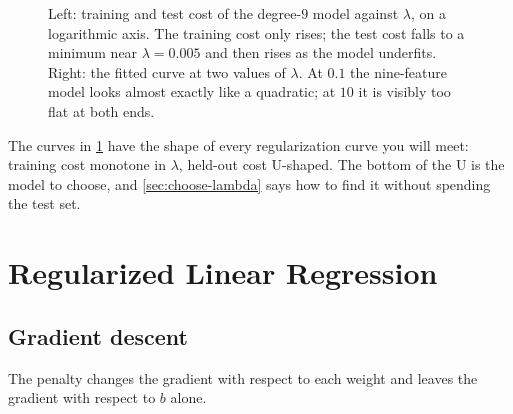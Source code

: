 \begin{figure}[htbp]
\begin{minipage}[t]{0.48\linewidth}
  \end{minipage}
  \caption{Left: training and test cost of the degree-$9$ model against
  $\lambda$, on a logarithmic axis. The training cost only rises; the test cost
  falls to a minimum near $\lambda = 0.005$ and then rises as the model
  underfits. Right: the fitted curve at two values of $\lambda$. At $0.1$ the
  nine-feature model looks almost exactly like a quadratic; at $10$ it is
  visibly too flat at both ends.}
  \label{fig:lambda-sweep}
\end{figure}

The curves in \cref{fig:lambda-sweep} have the shape of every regularization
curve you will meet: training cost monotone in $\lambda$, held-out cost
U-shaped. The bottom of the U is the model to choose, and \cref{sec:choose-lambda}
says how to find it without spending the test set.

\section{Regularized Linear Regression}
\label{sec:reg-linreg}

\subsection{Gradient descent}

The penalty changes the gradient with respect to each weight and leaves the
gradient with respect to $b$ alone.

